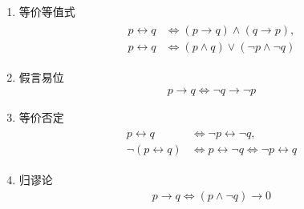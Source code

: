 \begin{enumerate}
	\item 等价等值式
	\begin{align*}
		\begin{aligned}
			p \leftrightarrow q 
			&\Leftrightarrow (p \rightarrow q) \land (q \rightarrow p),\\
			p \leftrightarrow q
			&\Leftrightarrow (p \land q) \lor (\neg p \land \neg q)
		\end{aligned}
	\end{align*}
	
	\item 假言易位
	\begin{align*}
		p \rightarrow q \Leftrightarrow \neg q \rightarrow \neg p
	\end{align*}
	
	\item 等价否定
	\begin{align*}
		\begin{aligned}
			p \leftrightarrow q 
			&\Leftrightarrow \neg p \leftrightarrow \neg q,\\
			\neg(p \leftrightarrow q)
			&\Leftrightarrow p \leftrightarrow \neg q
			\Leftrightarrow \neg p \leftrightarrow q
		\end{aligned}
	\end{align*}
	
	\item 归谬论
	\begin{align*}
		p \rightarrow q \Leftrightarrow (p \land \neg q) \rightarrow 0
	\end{align*}
\end{enumerate}

